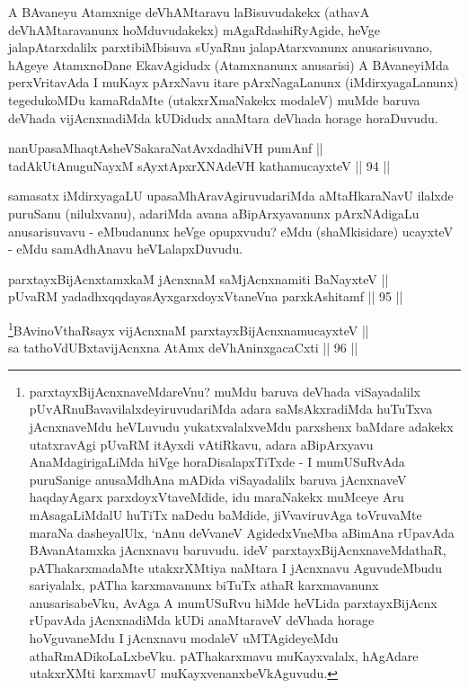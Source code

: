 \begin{artha}
A BAvaneyu Atamxnige deVhAMtaravu laBisuvudakekx (athavA
deVhAMtaravanunx hoMduvudakekx) mAgaRdashiRyAgide, heVge
jalapAtarxdalilx parxtibiMbisuva sUyaRnu jalapAtarxvanunx
anusarisuvano, hAgeye AtamxnoDane EkavAgidudx (Atamxnanunx anusarisi)
A BAvaneyiMda perxVritavAda I muKayx pArxNavu itare pArxNagaLanunx
(iMdirxyagaLanunx) tegedukoMDu kamaRdaMte (utakxrXmaNakekx modaleV)
muMde baruva deVhada vijAcnxnadiMda kUDidudx anaMtara deVhada horage
horaDuvudu.
\end{artha}

\begin{shl}
nanUpasaMhaqtAsheVSakaraNatAvxdadhiVH pumAnf || \\
tadAkUtAnuguNayxM sAyxtApxrXNAdeVH kathamucayxteV \hfill || 94 ||  
\end{shl}

\begin{artha}
samasatx iMdirxyagaLU upasaMhAravAgiruvudariMda aMtaHkaraNavU ilalxde
puruSanu (nilulxvanu), adariMda avana aBipArxyavanunx pArxNAdigaLu
anusarisuvavu - eMbudanunx heVge opupxvudu? eMdu (shaMkisidare)
ucayxteV - eMdu samAdhAnavu heVLalapxDuvudu.
\end{artha}


\begin{shl}
parxtayxBijAcnxtamxkaM jAcnxnaM saMjAcnxnamiti BaNayxteV || \\
pUvaRM yadadhxqqdayasAyxgarxdoyxVtaneVna parxkAshitamf \hfill || 95 ||  
\end{shl}

\begin{shl}
\footnote{parxtayxBijAcnxnaveMdareVnu? muMdu baruva deVhada
viSayadalilx pUvARnuBavavilalxdeyiruvudariMda adara saMsAkxradiMda
huTuTxva jAcnxnaveMdu heVLuvudu yukatxvalalxveMdu parxshenx baMdare
adakekx utatxravAgi pUvaRM itAyxdi vAtiRkavu, adara aBipArxyavu
AnaMdagirigaLiMda hiVge horaDisalapxTiTxde - I mumUSuRvAda
puruSanige anusaMdhAna mADida viSayadalilx baruva jAcnxnaveV
haqdayAgarx parxdoyxVtaveMdide, idu maraNakekx muMceye Aru
mAsagaLiMdalU huTiTx naDedu baMdide, jiVvaviruvAga toVruvaMte maraNa
dasheyalUlx, `nAnu deVvaneV AgidedxVneMba aBimAna rUpavAda
BAvanAtamxka jAcnxnavu baruvudu. ideV parxtayxBijAcnxnaveMdathaR,
pAThakarxmadaMte utakxrXMtiya naMtara I jAcnxnavu AguvudeMbudu
sariyalalx, pATha karxmavanunx biTuTx athaR karxmavanunx
anusarisabeVku, AvAga A mumUSuRvu hiMde heVLida parxtayxBijAcnx
rUpavAda jAcnxnadiMda kUDi anaMtaraveV deVhada horage hoVguvaneMdu I
jAcnxnavu modaleV uMTAgideyeMdu athaRmADikoLaLxbeVku. pAThakarxmavu
muKayxvalalx, hAgAdare utakxrXMti karxmavU muKayxvenanxbeVkAguvudu.}BAvinoV\s thaRsayx vijAcnxnaM parxtayxBijAcnxnamucayxteV ||  \\
sa tathoVdUBxtavijAcnxna AtAmx deVhAninxgacaCxti \hfill || 96 || 
\end{shl}



